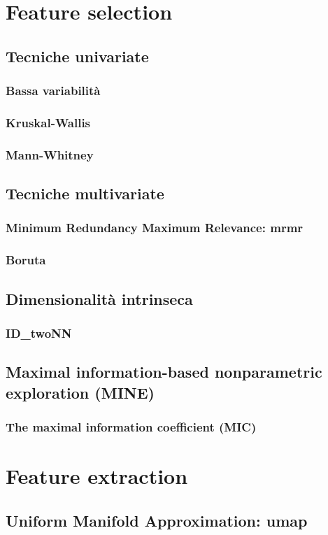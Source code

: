 \documentclass[12pt,italian]{report}
\begin{document}
	\chapter{Feature selection}
	\section{Tecniche univariate}
	\subsection{Bassa variabilità}
	\subsection{Kruskal-Wallis}
	\subsection{Mann-Whitney}
	\section{Tecniche multivariate}
	\subsection{Minimum Redundancy Maximum Relevance: mrmr}
	\subsection{Boruta}
	\section{Dimensionalità intrinseca}
	\subsection{ID\_twoNN}
	\section{Maximal information-based nonparametric exploration (MINE)}
	\subsection{The maximal information coefficient (MIC)}
	
	\chapter{Feature extraction}
	\section{Uniform Manifold Approximation: umap}
	
\end{document}
